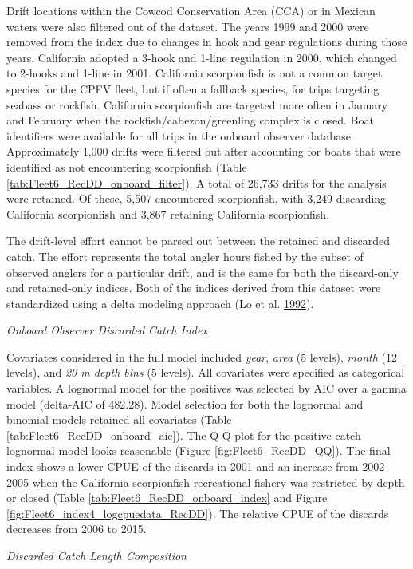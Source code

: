 \documentclass[12pt,]{article}
\begin{document}
Drift locations within the Cowcod Conservation Area (CCA) or in Mexican
waters were also filtered out of the dataset. The years 1999 and 2000
were removed from the index due to changes in hook and gear regulations
during those years. California adopted a 3-hook and 1-line regulation in
2000, which changed to 2-hooks and 1-line in 2001. California
scorpionfish is not a common target species for the CPFV fleet, but if
often a fallback species, for trips targeting seabass or rockfish.
California scorpionfish are targeted more often in January and February
when the rockfish/cabezon/greenling complex is closed. Boat identifiers
were available for all trips in the onboard observer database.
Approximately 1,000 drifts were filtered out after accounting for boats
that were identified as not encountering scorpionfish (Table
\ref{tab:Fleet6_RecDD_onboard_filter}). A total of 26,733 drifts for the
analysis were retained. Of these, 5,507 encountered scorpionfish, with
3,249 discarding California scorpionfish and 3,867 retaining California
scorpionfish.

The drift-level effort cannot be parsed out between the retained and
discarded catch. The effort represents the total angler hours fished by
the subset of observed anglers for a particular drift, and is the same
for both the discard-only and retained-only indices. Both of the indices
derived from this dataset were standardized using a delta modeling
approach (Lo et al. \protect\hyperlink{ref-Lo1992}{1992}).

\emph{Onboard Observer Discarded Catch Index}

Covariates considered in the full model included \emph{year},
\emph{area} (5 levels), \emph{month} (12 levels), and \emph{20 m depth
bins} (5 levels). All covariates were specified as categorical
variables. A lognormal model for the positives was selected by AIC over
a gamma model (delta-AIC of 482.28). Model selection for both the
lognormal and binomial models retained all covariates (Table
\ref{tab:Fleet6_RecDD_onboard_aic}). The Q-Q plot for the positive catch
lognormal model looks reasonable (Figure \ref{fig:Fleet6_RecDD_QQ}). The
final index shows a lower CPUE of the discards in 2001 and an increase
from 2002-2005 when the California scorpionfish recreational fishery was
restricted by depth or closed (Table
\ref{tab:Fleet6_RecDD_onboard_index} and Figure
\ref{fig:Fleet6_index4_logcpuedata_RecDD}). The relative CPUE of the
discards decreases from 2006 to 2015.

\emph{Discarded Catch Length Composition}
\end{document}
